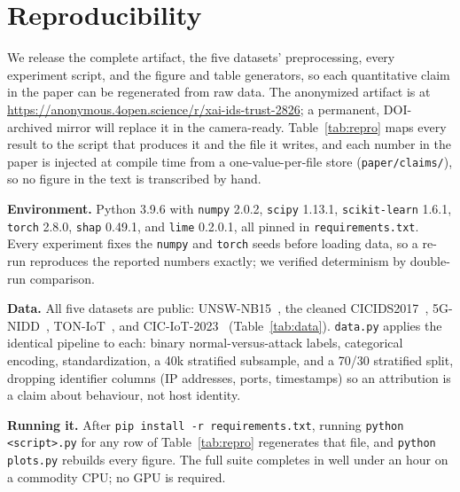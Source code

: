 \documentclass[conference]{IEEEtran}
\begin{document}
\section{Reproducibility}\label{app:repro}
We release the complete artifact, the five datasets' preprocessing, every experiment script, and
the figure and table generators, so each quantitative claim in the paper can be regenerated from raw
data. The anonymized artifact is at
\url{https://anonymous.4open.science/r/xai-ids-trust-2826}; a permanent, DOI-archived mirror will
replace it in the camera-ready. Table~\ref{tab:repro} maps every result to the script that produces
it and the file it writes, and each number in the paper is injected at compile time from a
one-value-per-file store (\texttt{paper/claims/}), so no figure in the text is transcribed by hand.

\textbf{Environment.} Python 3.9.6 with \texttt{numpy} 2.0.2, \texttt{scipy} 1.13.1,
\texttt{scikit-learn} 1.6.1, \texttt{torch} 2.8.0, \texttt{shap} 0.49.1, and \texttt{lime} 0.2.0.1,
all pinned in \texttt{requirements.txt}. Every experiment fixes the \texttt{numpy} and
\texttt{torch} seeds before loading data, so a re-run reproduces the reported numbers exactly; we
verified determinism by double-run comparison.

\textbf{Data.} All five datasets are public: UNSW-NB15~\cite{unsw2015}, the cleaned
CICIDS2017~\cite{cicids2017,engelen2021}, 5G-NIDD~\cite{g5nidd}, TON-IoT~\cite{toniot2020}, and
CIC-IoT-2023~\cite{ciciot2023} (Table~\ref{tab:data}). \texttt{data.py} applies the identical pipeline to each: binary
normal-versus-attack labels, categorical encoding, standardization, a 40k stratified subsample, and
a 70/30 stratified split, dropping identifier columns (IP addresses, ports, timestamps) so an
attribution is a claim about behaviour, not host identity.

\textbf{Running it.} After \texttt{pip install -r requirements.txt}, running \texttt{python
<script>.py} for any row of Table~\ref{tab:repro} regenerates that file, and \texttt{python
plots.py} rebuilds every figure. The full suite completes in well under an hour on a commodity CPU;
no GPU is required.
\end{document}
